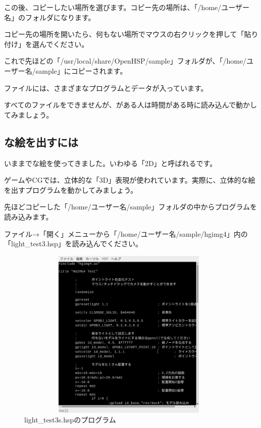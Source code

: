この後、コピーしたい場所を選びます。コピー先の場所は、「/home/ユーザー名」のフォルダになります。

コピー先の場所を開いたら、何もない場所でマウスの右クリックを押して「貼り付け」を選んでください。

これで先ほどの「/usr/local/share/OpenHSP/sample」フォルダが、「/home/ユーザー名/sample」にコピーされます。

ファイルには、さまざまなプログラムとデータが入っています。

すべてのファイルをできませんが、がある人は時間がある時に読み込んで動かしてみましょう。



\newpage
\subsection{な絵を出すには}

いままでな絵を使ってきました。いわゆる「2D」と呼ばれるです。

ゲームやCGでは、立体的な「3D」表現が使われています。実際に、立体的な絵を出すプログラムを動かしてみましょう。


先ほどコピーした「/home/ユーザー名/sample」フォルダの中からプログラムを読み込みます。

ファイル→「開く」メニューから「/home/ユーザー名/sample/hgimg4」内の「light\_test3.hsp」を読み込んでください。


\begin{figure}[H]
    \begin{center}
      \includegraphics[keepaspectratio,width=10.971cm,height=8.229cm]{text04-img/s_lighttest3s.png}
      \caption{light\_test3s.hspのプログラム}
    \end{center}
    \label{fig:prog_menu}
\end{figure}

